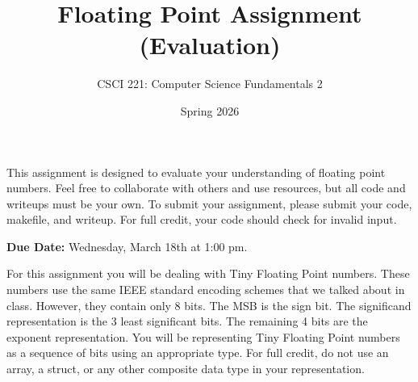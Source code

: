 \documentclass{exam}
\begin{document}
\title{Floating Point Assignment (Evaluation)}
\author{CSCI 221: Computer Science Fundamentals 2}
\date{Spring 2026}
\maketitle


This assignment is designed to evaluate your understanding of floating point numbers. 
Feel free to collaborate with others and use resources, but all code and writeups must be your own. 
To submit your assignment, please submit your code, makefile, and writeup. 
For full credit, your code should check for invalid input. 

\textbf{Due Date:}
Wednesday, March 18th at 1:00 pm. 

For this assignment you will be dealing with Tiny Floating Point numbers. 
These numbers use the same IEEE standard encoding schemes that we talked about in class. 
However, they contain only 8 bits. 
The MSB is the sign bit. 
The significand representation is the 3 least significant bits. 
The remaining 4 bits are the exponent representation. 
You will be representing Tiny Floating Point numbers as a sequence of bits using an appropriate type. 
For full credit, do not use an array, a struct, or any other composite data type in your representation. 
\end{document}
